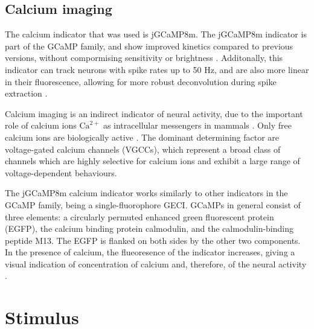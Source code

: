 \subsection{Calcium imaging}
The calcium indicator that was used is jGCaMP8m. The jGCaMP8m indicator is part of the GCaMP family, and show improved kinetics compared to previous versions, without compormising sensitivity or brightness \parencite{zhangFastSensitiveGCaMP2023}. Additonally, this indicator can track neurons with spike rates up to 50 Hz, and are also more linear in their fluorescence, allowing for more robust deconvolution during spike extraction \parencite{zhangFastSensitiveGCaMP2023}.

Calcium imaging is an indirect indicator of neural activity, due to the important role of calcium ions $\mathrm{Ca}^{2+}$ as intracellular messengers in mammals \parencite{grienbergerImagingCalciumNeurons2012}. Only free calcium ions are biologically active \parencite{grienbergerImagingCalciumNeurons2012}. The dominant determining factor are voltage-gated calcium channels (VGCCs), which represent a broad class of channels which are highly selective for calcium ions and exhibit a large range of voltage-dependent behaviours.

The jGCaMP8m calcium indicator works similarly to other indicators in the GCaMP family, being a single-fluorophore GECI. GCaMPs in general consist of three elements: a circularly permuted enhanced green fluorescent protein (EGFP), the calcium binding protein calmodulin, and the calmodulin-binding peptide M13. The EGFP is flanked on both sides by the other two components. In the presence of calcium, the flueoresence of the indicator increases, giving a visual indication of concentration of calcium and, therefore, of the neural activity \parencite{grienbergerImagingCalciumNeurons2012}.




\section{Stimulus}

